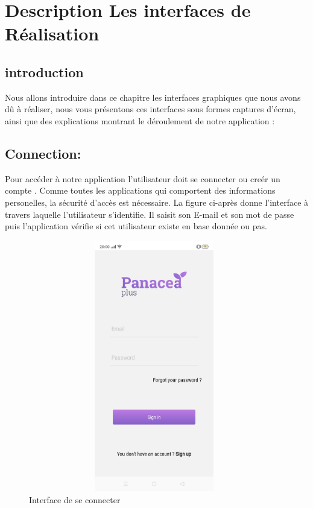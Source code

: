 \chapter{Description Les interfaces de Réalisation }


\section*{introduction}

Nous allons introduire dans ce chapitre les interfaces graphiques que nous avons dû
à réaliser, nous vous présentons ces interfaces sous formes captures d'écran, ainsi que des
explications montrant le déroulement de notre application :




\section{Connection:}
Pour accéder à notre application l'utilisateur doit se connecter ou creér un compte . Comme toutes les applications qui comportent des informations personelles, la sécurité d'accès est nécessaire. La figure ci-après donne l'interface à travers laquelle l'utilisateur s'identifie. Il saisit son E-mail et son mot de passe puis l'application  vérifie si cet utilisateur existe en base donnée ou pas.

\begin{figure}[H]
  \centering
\includegraphics[width=11cm,height=11cm,keepaspectratio]{Application/connecter.png} 
\caption{Interface de se connecter}
\end{figure}

